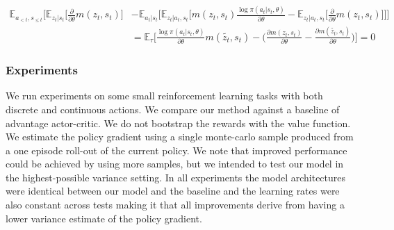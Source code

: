 \documentclass{article}
\newcommand{\E}{\mathbb{E}}
\newcommand{\LL}[1]{\frac{\log \pi(a_{#1}| s_{#1}, \theta)}{\partial \theta}}
\newcommand{\PT}{\frac{\partial}{\partial \theta}}
\begin{document}
\begin{align}
\E_{a_{<t},s_{\leq t}}\Big[\E_{z_t|s_t} \Big[ \PT m(z_t, s_t) \Big] &- \E_{a_t|s_t} \Big[ \E_{z_t|a_t, s_t}\Big[m(z_t, s_t) \LL{t} - \E_{z_t|a_t, s_t}\Big[\PT m(z_t, s_t)  \Big] \Big]\Big]\\
&= \E_\tau\Big[ \LL{t} m(\tilde{z_t}, s_t) - \Big(\frac{\partial m(z_t, s_t)}{\partial\theta} - \frac{\partial m(\tilde{z_t}, s_t)}{\partial\theta}\Big)\Big] = 0
\end{align}


\subsubsection{Experiments}
We run experiments on some small reinforcement learning tasks with both discrete and continuous actions. We compare our method against a baseline of advantage actor-critic. We do not bootstrap the rewards with the value function. We estimate the policy gradient using a single monte-carlo sample produced from a one episode roll-out of the current policy. We note that improved performance could be achieved by using more samples, but we intended to test our model in the highest-possible variance setting. In all experiments the model architectures were identical between our model and the baseline and the learning rates were also constant across tests making it that all improvements derive from having a lower variance estimate of the policy gradient. 
\end{document}
